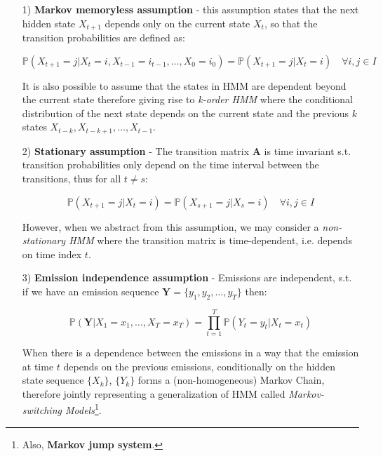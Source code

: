 \begin{itemize}
    \item[1)] \textbf{Markov memoryless assumption} - this assumption states that the next hidden state $X_{t+1}$ depends only on the current state $X_t$, so that the transition probabilities are defined as:

        \begin{equation}
            \mathbb{P}(X_{t+1} = j| X_{t} = i,X_{t-1} = i_{t-1}, \ldots,X_{0} = i_0) = \mathbb{P}(X_{t+1} = j| X_{t} = i) \quad \forall i,j \in I
        \end{equation}

        It is also possible to assume that the states in HMM are dependent beyond the current state therefore giving rise to \textit{k-order HMM} 
        where the conditional distribution of the next state depends on the current state and the previous $k$ states $X_{t-k}, X_{t-k+1}, \ldots, X_{t-1}$. \citep{Capp2005}

    \item[2)] \textbf{Stationary assumption} - The transition matrix $\textbf{A}$ is time invariant s.t. transition probabilities only depend on the time interval between the transitions, 
    thus for all $t \neq s$:

        \begin{equation}
            \mathbb{P}(X_{t+1} = j| X_{t}= i) = \mathbb{P}(X_{s+1} = j| X_s = i) \quad \forall i,j \in I
        \end{equation}

        However, when we abstract from this assumption, we may consider a \textit{non-stationary HMM} where the transition matrix is time-dependent, i.e. depends on time index $t$.

    \item[3)] \textbf{Emission independence assumption} - Emissions are independent, s.t. if we have an emission sequence $\textbf{Y} = \{y_1,y_2,\ldots,y_T\}$ then:

        \begin{equation}
            \mathbb{P}(\textbf{Y}|X_1 = x_1,\ldots,X_T = x_T) = \prod_{t=1}^T \mathbb{P}(Y_t = y_t|X_t = x_t)
        \end{equation}

        When there is a dependence between the emissions in a way that the emission at time $t$ depends on the previous emissions, conditionally on the hidden state sequence $\{X_k\}$, $\{Y_k\}$
        forms a (non-homogeneous) Markov Chain, therefore jointly representing a generalization of HMM called \textit{Markov-switching Models}\footnote{Also, \textbf{Markov jump system}.}. \citep{Capp2005}

\end{itemize}

